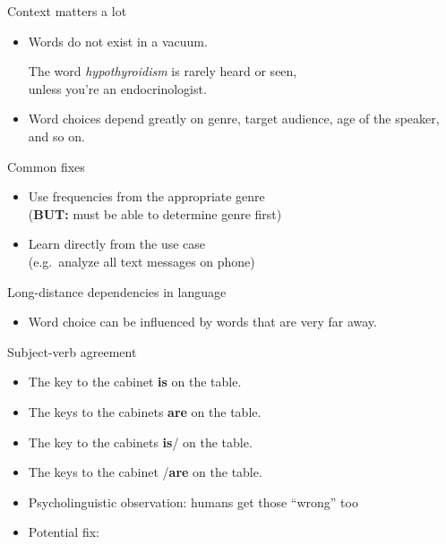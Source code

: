 \documentclass[professionalfonts, xcolor={usenames,svgnames,x11names,table}]{beamer}
\begin{document}
\begin{frame}{Context matters a lot}
    \begin{itemize}
        \item Words do not exist in a vacuum.

        \begin{example}
            The word \emph{hypothyroidism} is rarely heard or seen,\\
            unless you're an endocrinologist.
        \end{example}

        \item Word choices depend greatly on genre, target audience, age of the speaker, and so on.
    \end{itemize}

    \begin{block}{Common fixes}
        \begin{itemize}
            \item Use frequencies from the appropriate genre\\
                  (\textbf{BUT:} must be able to determine genre first)
            \item Learn directly from the use case\\
                  (e.g.~analyze all text messages on phone)
        \end{itemize}
    \end{block}
\end{frame}

\begin{frame}{Long-distance dependencies in language}
    \begin{itemize}
        \item Word choice can be influenced by words that are very far away.
    \end{itemize}

    \begin{exampleblock}{Subject-verb agreement}
        \begin{itemize}
            \item The key to the cabinet \textbf{is} on the table.
            \item The keys to the cabinets \textbf{are} on the table.
            \item The key to the cabinets \textbf{is}\slash{} on the table.
            \item The keys to the cabinet \slash\textbf{are} on the table.
        \end{itemize}
    \end{exampleblock}

    \begin{itemize}
        \item Psycholinguistic observation: humans get those ``wrong'' too
        \item Potential fix: 
    \end{itemize}
\end{frame}
\end{document}
